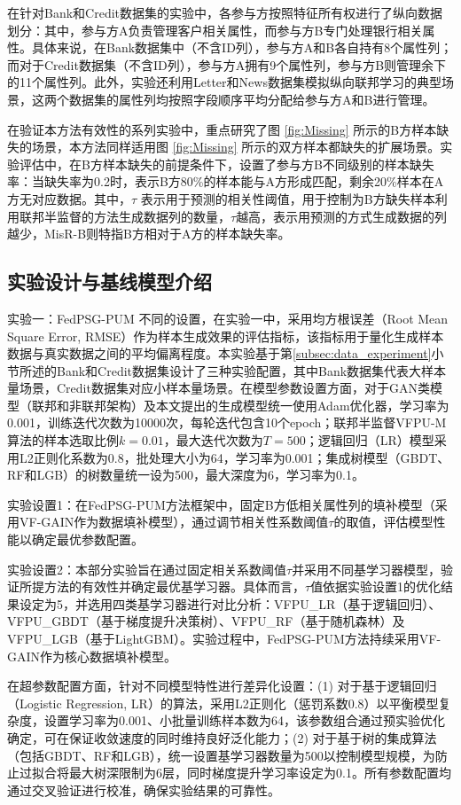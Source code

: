 在针对Bank和Credit数据集的实验中，各参与方按照特征所有权进行了纵向数据划分：其中，参与方A负责管理客户相关属性，而参与方B专门处理银行相关属性。具体来说，在Bank数据集中（不含ID列），参与方A和B各自持有8个属性列；而对于Credit数据集（不含ID列），参与方A拥有9个属性列，参与方B则管理余下的11个属性列。此外，实验还利用Letter和News数据集模拟纵向联邦学习的典型场景，这两个数据集的属性列均按照字段顺序平均分配给参与方A和B进行管理。

在验证本方法有效性的系列实验中，重点研究了图 \ref{fig:Missing} 所示的B方样本缺失的场景，本方法同样适用图 \ref{fig:Missing} 所示的双方样本都缺失的扩展场景。实验评估中，在B方样本缺失的前提条件下，设置了参与方B不同级别的样本缺失率：当缺失率为0.2时，表示B方80\%的样本能与A方形成匹配，剩余20\%样本在A方无对应数据。其中，$\tau$ 表示用于预测的相关性阈值，用于控制为B方缺失样本利用联邦半监督的方法生成数据列的数量，$\tau$越高，表示用预测的方式生成数据的列越少，MisR-B则特指B方相对于A方的样本缺失率。
\subsection{实验设计与基线模型介绍}
实验一：FedPSG-PUM 不同的设置，在实验一中，采用均方根误差（Root Mean Square Error, RMSE）作为样本生成效果的评估指标，该指标用于量化生成样本数据与真实数据之间的平均偏离程度。本实验基于第\ref{subsec:data_experiment}小节所述的Bank和Credit数据集设计了三种实验配置，其中Bank数据集代表大样本量场景，Credit数据集对应小样本量场景。在模型参数设置方面，对于GAN类模型（联邦和非联邦架构）及本文提出的生成模型统一使用Adam优化器，学习率为0.001，训练迭代次数为10000次，每轮迭代包含10个epoch；联邦半监督VFPU-M算法的样本选取比例$k=0.01$，最大迭代次数为$T=500$；逻辑回归（LR）模型采用L2正则化系数为0.8，批处理大小为64，学习率为0.001；集成树模型（GBDT、RF和LGB）的树数量统一设为500，最大深度为6，学习率为0.1。

实验设置1：在FedPSG-PUM方法框架中，固定B方低相关属性列的填补模型（采用VF-GAIN作为数据填补模型），通过调节相关性系数阈值$\tau$的取值，评估模型性能以确定最优参数配置。

实验设置2：本部分实验旨在通过固定相关系数阈值$\tau$并采用不同基学习器模型，验证所提方法的有效性并确定最优基学习器。具体而言，$\tau$值依据实验设置1的优化结果设定为5，并选用四类基学习器进行对比分析：VFPU\_LR（基于逻辑回归）、VFPU\_GBDT（基于梯度提升决策树）、VFPU\_RF（基于随机森林）及VFPU\_LGB（基于LightGBM）。实验过程中，FedPSG-PUM方法持续采用VF-GAIN作为核心数据填补模型。

在超参数配置方面，针对不同模型特性进行差异化设置：(1) 对于基于逻辑回归（Logistic Regression, LR）的算法，采用L2正则化（惩罚系数0.8）以平衡模型复杂度，设置学习率为0.001、小批量训练样本数为64，该参数组合通过预实验优化确定，可在保证收敛速度的同时维持良好泛化能力；(2) 对于基于树的集成算法（包括GBDT、RF和LGB），统一设置基学习器数量为500以控制模型规模，为防止过拟合将最大树深限制为6层，同时梯度提升学习率设定为0.1。所有参数配置均通过交叉验证进行校准，确保实验结果的可靠性。


